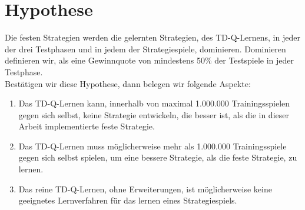\section{Hypothese}
\label{sec:Hypothese}
Die festen Strategien werden die gelernten Strategien, des TD-Q-Lernens, in jeder der drei Testphasen und in jedem der Strategiespiele, dominieren. Dominieren definieren wir, als eine Gewinnquote von mindestens 50\% der Testspiele in jeder Testphase. \\

Bestätigen wir diese Hypothese, dann belegen wir folgende Aspekte:

\begin{enumerate}
\item Das TD-Q-Lernen kann, innerhalb von maximal 1.000.000 Trainingsspielen gegen sich selbst, keine Strategie entwickeln, die besser ist, als die in dieser Arbeit implementierte feste Strategie.
\item Das TD-Q-Lernen muss möglicherweise mehr als 1.000.000 Trainingsspiele gegen sich selbst spielen, um eine bessere Strategie, als die feste Strategie, zu lernen.
\item Das reine TD-Q-Lernen, ohne Erweiterungen, ist möglicherweise keine geeignetes Lernverfahren für das lernen eines Strategiespiels.  
\end{enumerate}








